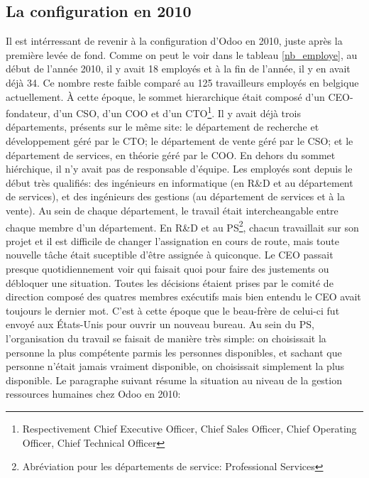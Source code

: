 \subsection{La configuration en 2010}
Il est intérressant de revenir à la configuration d'Odoo en 2010, juste après la première levée de fond. Comme on peut le voir dans le tableau \ref{nb_employe}, au début de l'année 2010, il y avait 18 employés et à la fin de l'année, il y en avait déjà 34. Ce nombre reste faible comparé au 125 travailleurs employés en belgique actuellement. À cette époque, le sommet hierarchique était composé d'un CEO-fondateur, d'un CSO, d'un COO et d'un CTO\footnote{Respectivement Chief Executive Officer, Chief Sales Officer, Chief Operating Officer, Chief Technical Officer}. Il y avait déjà trois départements, présents sur le même site: le département de recherche et développement géré par le CTO; le département de vente géré par le CSO; et le département de services, en théorie géré par le COO. En dehors du sommet hiérchique, il n'y avait pas de responsable d'équipe. Les employés sont depuis le début très qualifiés: des ingénieurs en informatique (en R\&D et au département de services), et des ingénieurs des gestions (au département de services et à la vente). Au sein de chaque département, le travail était intercheangable entre chaque membre d'un département. En R\&D et au PS\footnote{Abréviation pour les départements de service: Professional Services}, chacun travaillait sur son projet et il est difficile de changer l'assignation en cours de route, mais toute nouvelle tâche était suceptible d'être assignée à quiconque. Le CEO passait presque quotidiennement voir qui faisait quoi pour faire des justements ou débloquer une situation. Toutes les décisions étaient prises par le comité de direction composé des quatres membres exécutifs mais bien entendu le CEO avait toujours le dernier mot. C'est à cette époque que le beau-frère de celui-ci fut envoyé aux États-Unis pour ouvrir un nouveau bureau. Au sein du PS, l'organisation du travail se faisait de manière très simple: on choisissait la personne la plus compétente parmis les personnes disponibles, et sachant que personne n'était jamais vraiment disponible, on choisissait simplement la plus disponible. Le paragraphe suivant résume la situation au niveau de la gestion ressources humaines chez Odoo en 2010:

